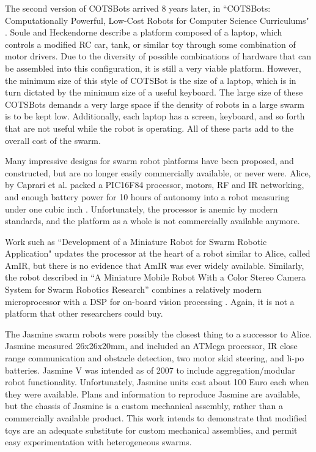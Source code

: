 \documentclass[]{article}
\begin{document}
The second version of COTSBots arrived 8 years later, in ``COTSBots: Computationally Powerful, Low-Cost Robots for Computer Science Curriculums" \cite{soule2011cotsbots}. Soule and Heckendorne describe a platform composed of a laptop, which controls a modified RC car, tank, or similar toy through some combination of motor drivers. 
Due to the diversity of possible combinations of hardware that can be assembled into this configuration, it is still a very viable platform. 
However, the minimum size of this style of COTSBot is the size of a laptop, which is in turn dictated by the minimum size of a useful keyboard. 
The large size of these COTSBots demands a very large space if the density of robots in a large swarm is to be kept low. 
Additionally, each laptop has a screen, keyboard, and so forth that are not useful while the robot is operating. 
All of these parts add to the overall cost of the swarm. 

Many impressive designs for swarm robot platforms have been proposed, and constructed, but are no longer easily commercially available, or never were. 
Alice, by Caprari et al. packed a PIC16F84 processor, motors, RF and IR networking, and enough battery power for 10 hours of autonomy into a robot measuring under one cubic inch \cite{caprari1998autonomous}. Unfortunately, the processor is anemic by modern standards, and the platform as a whole is not commercially available anymore.

Work such as ``Development of a Miniature Robot for Swarm Robotic Application" updates the processor at the heart of a robot similar to Alice, called AmIR, but there is no evidence that AmIR was ever widely available\cite{arvin2009development}. Similarly, the robot described in ``A Miniature Mobile Robot With a Color Stereo Camera System for Swarm Robotics Research'' combines a relatively modern microprocessor with a DSP for on-board vision processing \cite{haverinen2005miniature}. Again, it is not a platform that other researchers could buy.

The Jasmine swarm robots were possibly the closest thing to a successor to Alice.
Jasmine measured 26x26x20mm, and included an ATMega processor, IR close range communication and obstacle detection, two motor skid steering, and li-po batteries.
Jasmine V was intended as of 2007 to include aggregation/modular robot functionality.  Unfortunately, Jasmine units cost about 100 Euro each when they were available. 
Plans and information to reproduce Jasmine are available, but the chassis of Jasmine is a custom mechanical assembly, rather than a commercially available product. 
This work intends to demonstrate that modified toys are an adequate substitute for custom mechanical assemblies, and permit easy experimentation with heterogeneous swarms. 
\end{document}
